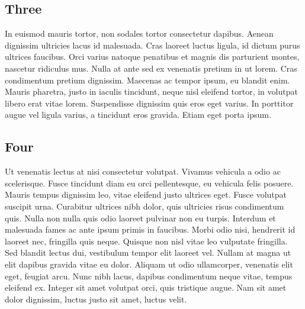 \begin{spacing}{1.5}
\section{Three}
In euismod mauris tortor, non sodales tortor consectetur dapibus. Aenean dignissim ultricies lacus id malesuada. Cras laoreet luctus ligula, id dictum purus ultrices faucibus. Orci varius natoque penatibus et magnis dis parturient montes, nascetur ridiculus mus. Nulla at ante sed ex venenatis pretium in ut lorem. Cras condimentum pretium dignissim. Maecenas ac tempor ipsum, eu blandit enim. Mauris pharetra, justo in iaculis tincidunt, neque nisl eleifend tortor, in volutpat libero erat vitae lorem. Suspendisse dignissim quis eros eget varius. In porttitor augue vel ligula varius, a tincidunt eros gravida. Etiam eget porta ipsum.


\subsection{Four}
Ut venenatis lectus at nisi consectetur volutpat. Vivamus vehicula a odio ac scelerisque. Fusce tincidunt diam eu orci pellentesque, eu vehicula felis posuere. Mauris tempus dignissim leo, vitae eleifend justo ultrices eget. Fusce volutpat suscipit urna. Curabitur ultrices nibh dolor, quis ultricies risus condimentum quis. Nulla non nulla quis odio laoreet pulvinar non eu turpis. Interdum et malesuada fames ac ante ipsum primis in faucibus. Morbi odio nisi, hendrerit id laoreet nec, fringilla quis neque. Quisque non nisl vitae leo vulputate fringilla. Sed blandit lectus dui, vestibulum tempor elit laoreet vel. Nullam at magna ut elit dapibus gravida vitae eu dolor. Aliquam ut odio ullamcorper, venenatis elit eget, feugiat arcu. Nunc nibh lacus, dapibus condimentum neque vitae, tempus eleifend ex. Integer sit amet volutpat orci, quis tristique augue. Nam sit amet dolor dignissim, luctus justo sit amet, luctus velit.

\end{spacing}
\newpage
